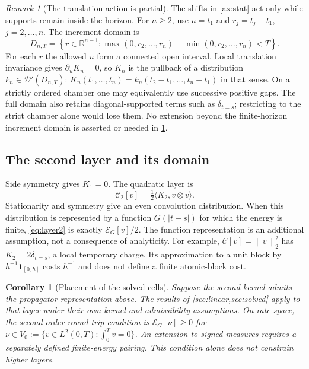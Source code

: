 \documentclass[11pt]{article}
\newcommand{\norm}[1]{\left\lVert #1\right\rVert}
\numberwithin{equation}{section}
\newtheorem{corollary}[theorem]{Corollary}
\theoremstyle{definition}
\theoremstyle{remark}
\newtheorem{remark}[theorem]{Remark}
\newcommand{\R}{\mathbb{R}}
\theoremstyle{definition}
\begin{document}
\begin{remark}[The translation action is partial]\label{rem:partialaction}
The shifts in \cref{ax:stat} act only while supports remain inside the
horizon. For $n\ge2$, use $u=t_1$ and $r_j=t_j-t_1$, $j=2,\ldots,n$.
The increment domain is
\[
 D_{n,T}=\left\{r\in\R^{n-1}:
 \max(0,r_2,\ldots,r_n)-\min(0,r_2,\ldots,r_n)<T\right\}.
\]
For each $r$ the allowed $u$ form a connected open interval. Local
translation invariance gives $\partial_uK_n=0$, so $K_n$ is the pullback
of a distribution $k_n\in\mathcal D'(D_{n,T})$:
$K_n(t_1,\ldots,t_n)=k_n(t_2-t_1,\ldots,t_n-t_1)$ in that sense.
On a strictly ordered chamber one may equivalently use successive positive
gaps. The full domain also retains diagonal-supported terms such as
$\delta_{t=s}$; restricting to the strict chamber alone would lose them.
No extension beyond the finite-horizon increment domain is asserted or
needed in \cref{cor:placement}.
\end{remark}

\subsection{The second layer and its domain}
Side symmetry gives $K_1=0$. The quadratic layer is
\begin{equation}\label{eq:layer2}
 \mathcal C_2[v]=\tfrac12\langle K_2,v\otimes v\rangle .
\end{equation}
Stationarity and symmetry give an even convolution distribution. When this
distribution is represented by a function $G(|t-s|)$ for which the energy is
finite, \eqref{eq:layer2} is exactly $\mathcal E_G[v]/2$. The function
representation is an additional assumption, not a consequence of analyticity.
For example, $\mathcal C[v]=\norm v_2^2$ has
$K_2=2\delta_{t=s}$, a local temporary charge. Its approximation to a unit
block by $h^{-1}\mathbf1_{[0,h]}$ costs $h^{-1}$ and does not define a finite
atomic-block cost.

\begin{corollary}[Placement of the solved cells]\label{cor:placement}
Suppose the second kernel admits the propagator representation above.
The results of \cref{sec:linear,sec:solved} apply to that layer under their
own kernel and admissibility assumptions. On rate space, the second-order
round-trip condition is $\mathcal E_G[\nu]\ge0$ for
$\nu\in V_0:=\{v\in L^2(0,T):\int_0^Tv=0\}$. An extension to signed
measures requires a separately defined finite-energy pairing. This condition
alone does not constrain higher layers.
\end{corollary}
\end{document}
